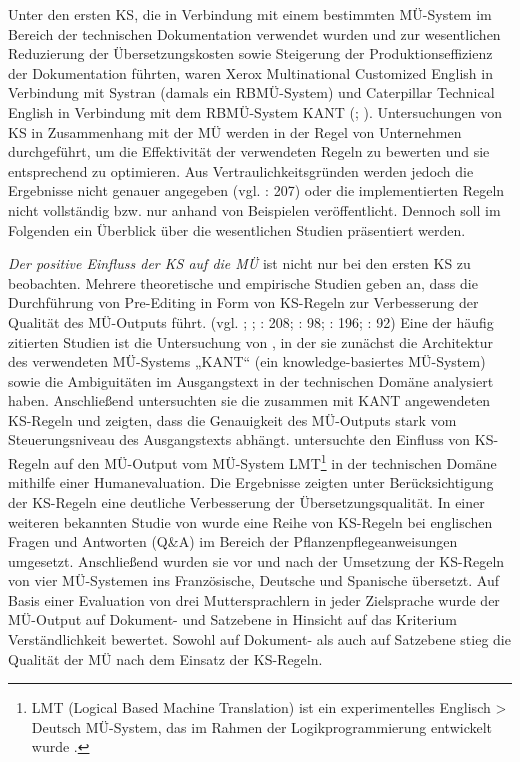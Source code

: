 Unter den ersten KS, die in Verbindung mit einem bestimmten MÜ-System im Bereich der technischen Dokumentation verwendet wurden und zur wesentlichen Reduzierung der Übersetzungskosten sowie Steigerung der Produktionseffizienz der Dokumentation führten, waren Xerox Multinational Customized English in Verbindung mit Systran (damals ein RBMÜ-System) \citep{Elliston1979} und Caterpillar Technical English in Verbindung mit dem RBMÜ-System KANT (\citealt{NybergMitamura1996}; \citealt{KamprathEtAl1998}). Untersuchungen von KS in Zusammenhang mit der MÜ werden in der Regel von Unternehmen durchgeführt, um die Effektivität der verwendeten Regeln zu bewerten und sie entsprechend zu optimieren. Aus Vertraulichkeitsgründen werden jedoch die Ergebnisse nicht genauer angegeben (vgl. \citealt{BernthGdaniec2001}: 207) oder die implementierten Regeln nicht vollständig bzw. nur anhand von Beispielen veröffentlicht. Dennoch soll im Folgenden ein Überblick über die wesentlichen Studien präsentiert werden.

\textit{Der positive Einfluss der KS auf die MÜ} ist nicht nur bei den ersten KS zu beobachten. Mehrere theoretische und empirische Studien geben an, dass die Durchführung von Pre-Editing in Form von KS-Regeln zur Verbesserung der Qualität des MÜ-Outputs führt. (vgl. \citealt{NybergMitamura1996}; \citealt{Bernth1999}; \citealt{BernthGdaniec2001}: 208; \citealt{Drugan2013}: 98; \citealt{DrewerZiegler2014}: 196; \citealt{Wittkowsky2017}: 92) Eine der häufig zitierten Studien ist die Untersuchung von \citet{NybergMitamura1996}, in der sie zunächst die Architektur des verwendeten MÜ-Systems „KANT“ (ein knowledge-basiertes MÜ-System) sowie die Ambiguitäten im Ausgangstext in der technischen Domäne analysiert haben. Anschließend untersuchten sie die zusammen mit KANT angewendeten KS-Regeln und zeigten, dass die Genauigkeit des MÜ-Outputs stark vom Steuerungsniveau des Ausgangstexts abhängt. \citet{Bernth1999} untersuchte den Einfluss von KS-Regeln auf den MÜ-Output vom MÜ-System LMT\footnote{{{{L}}}\textrm{MT (Logical Based Machine Translation) ist ein experimentelles Englisch > Deutsch MÜ-System, das im Rahmen der Logikprogrammierung entwickelt wurde \citep{McCord1989}.}} in der technischen Domäne mithilfe einer Humanevaluation. Die Ergebnisse zeigten unter Berücksichtigung der KS-Regeln eine deutliche Verbesserung der Übersetzungsqualität. In einer weiteren bekannten Studie von \citet[208]{BernthGdaniec2001} wurde eine Reihe von KS-Regeln bei englischen Fragen und Antworten (Q\&A) im Bereich der Pflanzenpflegeanweisungen umgesetzt. Anschließend wurden sie vor und nach der Umsetzung der KS-Regeln von vier MÜ-Systemen ins Französische, Deutsche und Spanische übersetzt. Auf Basis einer Evaluation von drei Muttersprachlern in jeder Zielsprache wurde der MÜ-Output auf Dokument- und Satzebene in Hinsicht auf das Kriterium Verständlichkeit bewertet. Sowohl auf Dokument- als auch auf Satzebene stieg die Qualität der MÜ nach dem Einsatz der KS-Regeln.

